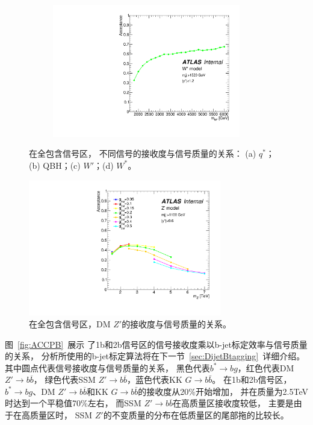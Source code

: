 \begin{figure}[htbp]
\begin{subfigure}{.5\textwidth}
   \caption{}
   \label{fig:WPrime1}
  \end{subfigure}
  \begin{subfigure}{.5\textwidth}
  \centering
   \includegraphics[width=0.9\textwidth]{figuresDijet/03-BenchmarkSignals/Acc_Wstar_yS1p2.pdf}
   \caption{}
   \label{fig:WStar1}
  \end{subfigure}
  \caption{
在全包含信号区，
不同信号的接收度与信号质量的关系：
(a) $q^*$；(b) QBH；(c) $W\prime$；(d) $W^*$。
  }
  \label{fig:ACCP}
\end{figure} 

\begin{figure}[thbp]
  \centering
  \includegraphics[width=0.75\textwidth]{figuresDijet/03-BenchmarkSignals/Acc_Zprime.pdf}
  \caption{ 在全包含信号区，DM $Z'$的接收度与信号质量的关系。 }
  \label{fig:ACCPZ}
\end{figure}

图~\ref{fig:ACCPB}~展示
了1b和2b信号区的信号接收度乘以b-jet标定效率与信号质量的关系，
分析所使用的b-jet标定算法将在下一节~\ref{sec:DijetBtagging}~详细介绍。
其中圆点代表信号接收度与信号质量的关系，
黑色代表$b^*\to bg$，红色代表DM $Z\prime \to b\overline{b}$，
绿色代表SSM $Z\prime \to b\overline{b}$，蓝色代表KK $G \rightarrow b\bar{b}$。
在1b和2b信号区，
$b^*\to bg$、DM $Z\prime \to b\overline{b}$和KK $G \rightarrow b\bar{b}$的接收度从20\%开始增加，
并在质量为2.5TeV时达到一个平稳值70\%左右，
而SSM $Z\prime \to b\overline{b}$在高质量区接收度较低，
主要是由于在高质量区时，
SSM $Z'$的不变质量的分布在低质量区的尾部拖的比较长。

